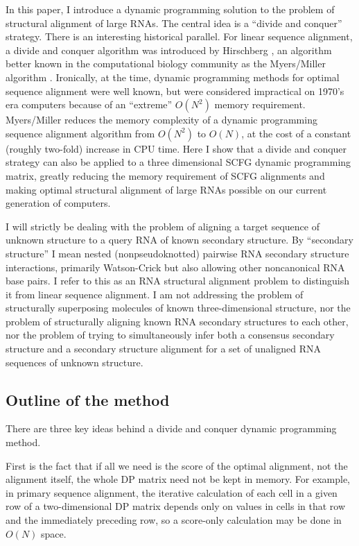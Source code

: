 \documentclass[11pt]{article}
\begin{document}
In this paper, I introduce a dynamic programming solution to the
problem of structural alignment of large RNAs. The central idea is a
``divide and conquer'' strategy. There is an interesting historical
parallel.  For linear sequence alignment, a divide and conquer
algorithm was introduced by Hirschberg \cite{Hirschberg75}, an
algorithm better known in the computational biology community as the
Myers/Miller algorithm \cite{MyM-88a}.  Ironically, at the time,
dynamic programming methods for optimal sequence alignment were well
known, but were considered impractical on 1970's era computers because
of an ``extreme'' $O(N^2)$ memory requirement. Myers/Miller reduces
the memory complexity of a dynamic programming sequence alignment
algorithm from $O(N^2)$ to $O(N)$, at the cost of a constant (roughly
two-fold) increase in CPU time. Here I show that a divide and conquer
strategy can also be applied to a three dimensional SCFG dynamic
programming matrix, greatly reducing the memory requirement of SCFG
alignments and making optimal structural alignment of large RNAs
possible on our current generation of computers.

I will strictly be dealing with the problem of aligning a target
sequence of unknown structure to a query RNA of known secondary
structure. By ``secondary structure'' I mean nested (nonpseudoknotted)
pairwise RNA secondary structure interactions, primarily Watson-Crick
but also allowing other noncanonical RNA base pairs. I refer to this
as an RNA structural alignment problem to distinguish it from linear
sequence alignment. I am not addressing the problem of structurally
superposing molecules of known three-dimensional structure, nor the
problem of structurally aligning known RNA secondary structures to
each other, nor the problem of trying to simultaneously infer both a
consensus secondary structure and a secondary structure alignment for
a set of unaligned RNA sequences of unknown structure.

\subsection{Outline of the method}

There are three key ideas behind a divide and conquer dynamic
programming method.

First is the fact that if all we need is the score of the optimal
alignment, not the alignment itself, the whole DP matrix need not be
kept in memory. For example, in primary sequence alignment, the
iterative calculation of each cell in a given row of a two-dimensional
DP matrix depends only on values in cells in that row and the
immediately preceding row, so a score-only calculation may be done in
$O(N)$ space.
\end{document}
